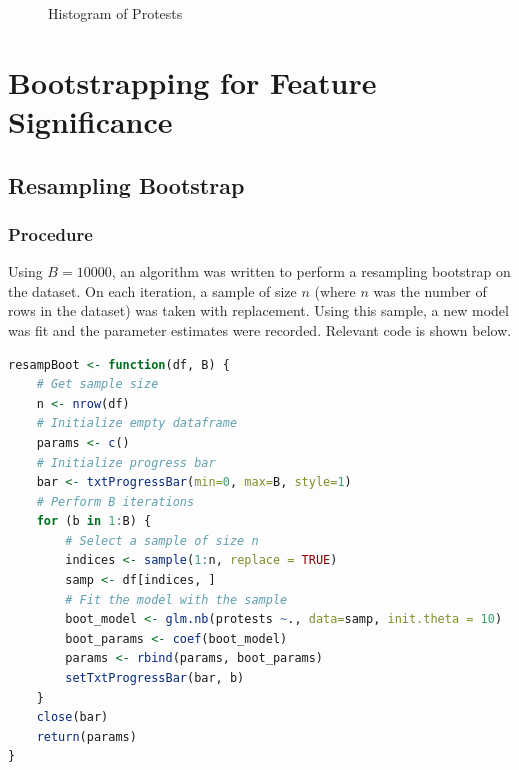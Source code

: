 \documentclass[12pt]{article}
\begin{document}
\begin{figure}[h!]
  \centering
  \caption{Histogram of Protests}
  \label{fig:your_label}
\end{figure}

\newpage
\section{Bootstrapping for Feature Significance}
\subsection{Resampling Bootstrap}
\subsubsection*{Procedure}
Using $B = 10000$, an algorithm was written to perform a resampling bootstrap on the dataset. On each iteration, a sample of size $n$ (where $n$ was the number of rows in the dataset) was taken with replacement. Using this sample, a new model was fit and the parameter estimates were recorded. Relevant code is shown below.

\vspace{1cm}
\begin{lstlisting}[language=R]
resampBoot <- function(df, B) {
	# Get sample size
	n <- nrow(df)
	# Initialize empty dataframe
	params <- c()
	# Initialize progress bar
	bar <- txtProgressBar(min=0, max=B, style=1)
	# Perform B iterations
	for (b in 1:B) {
		# Select a sample of size n
		indices <- sample(1:n, replace = TRUE)
		samp <- df[indices, ]
		# Fit the model with the sample
		boot_model <- glm.nb(protests ~., data=samp, init.theta = 10)
		boot_params <- coef(boot_model)
		params <- rbind(params, boot_params)
		setTxtProgressBar(bar, b)
	}
	close(bar)
	return(params)
}
\end{lstlisting}
\end{document}
